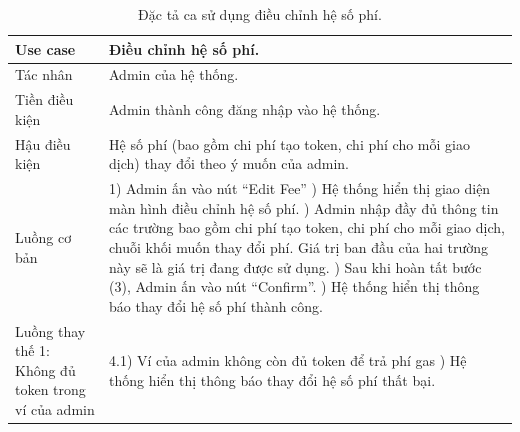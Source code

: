 \begin{table}[H]
    \centering
    \begin{tabular}{|p{5cm}|p{8cm}|}
        \hline
        Use case                                            & Điều chỉnh hệ số phí.                                      \\
        \hline
        Tác nhân                                            & Admin của hệ thống.                                        \\
        \hline
        Tiền điều kiện                                      & Admin thành công đăng nhập vào hệ thống.                   \\
        \hline
        Hậu điều kiện                                       & Hệ số phí (bao gồm chi phí tạo token, chi phí cho mỗi giao
        dịch) thay đổi theo ý muốn của admin.                                                                            \\
        \hline
        Luồng cơ bản                                        & 1) Admin ấn vào nút ``Edit Fee'' \newline
        2) Hệ thống hiển thị giao diện màn hình điều chỉnh hệ số phí. \newline
        3) Admin nhập đầy đủ thông tin các trường bao gồm chi phí tạo token, chi phí
        cho mỗi giao dịch, chuỗi khối muốn thay đổi phí. Giá trị ban đầu của hai trường
        này sẽ là giá trị đang được sử dụng. \newline
        4) Sau khi hoàn tất bước (3), Admin ấn vào nút ``Confirm''. \newline
        5) Hệ thống hiển thị thông báo thay đổi hệ số phí thành công.                                                    \\
        \hline
        Luồng thay thế 1: Không đủ token trong ví của admin & 4.1) Ví của admin không
        còn đủ token để trả phí gas \newline
        5.1) Hệ thống hiển thị thông báo thay đổi hệ số phí thất bại.                                                    \\
        \hline
    \end{tabular}
    \caption{Đặc tả ca sử dụng điều chỉnh hệ số phí.}
    \label{tab:fee-adjustment}
\end{table}

